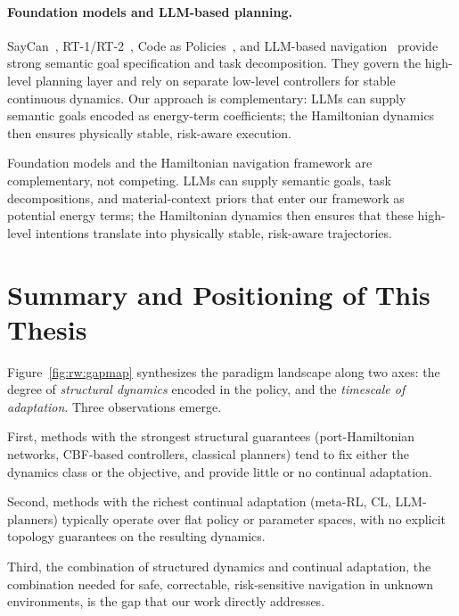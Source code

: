 \paragraph{Foundation models and LLM-based planning.}
SayCan~\citep{ahn2022saycan}, RT-1/RT-2~\citep{brohan2023rt1roboticstransformerrealworld,rt22023},
Code as Policies~\citep{liang2022code}, and LLM-based
navigation~\citep{zhu2024navi2gazeleveragingfoundationmodels,xiong2026sfconavefficientzeroshotvisual}
provide strong semantic goal specification and task decomposition.
They govern the high-level planning layer and rely on separate
low-level controllers for stable continuous dynamics.
Our approach is complementary: LLMs can supply semantic goals encoded
as energy-term coefficients; the Hamiltonian dynamics then ensures
physically stable, risk-aware execution.

Foundation models and the Hamiltonian navigation framework are
complementary, not competing.
LLMs can supply semantic goals, task decompositions, and material-context
priors that enter our framework as potential energy terms; the
Hamiltonian dynamics then ensures that these high-level intentions translate
into physically stable, risk-aware trajectories.

\section{Summary and Positioning of This Thesis}
\label{sec:rw:summary}

Figure~\ref{fig:rw:gapmap} synthesizes the paradigm landscape along two axes:
the degree of \emph{structural dynamics} encoded in the policy, and the
\emph{timescale of adaptation}.
Three observations emerge.

First, methods with the strongest structural guarantees (port-Hamiltonian
networks, CBF-based controllers, classical planners) tend to fix either the
dynamics class or the objective, and provide little or no continual
adaptation.

Second, methods with the richest continual adaptation (meta-RL, CL,
LLM-planners) typically operate over flat policy or parameter spaces, with no
explicit topology guarantees on the resulting dynamics.

Third, the combination of structured dynamics and continual adaptation, the
combination needed for safe, correctable, risk-sensitive navigation in unknown
environments, is the gap that our work directly addresses.


